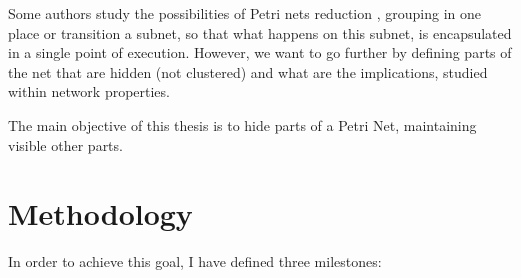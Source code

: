 Some authors study the possibilities of Petri nets reduction \citep{SN-Valette197935,SN-Suzuki198351,SN-Fahmy1990321,SN-DRUZHININVA19921922,SN-Fahmy1993127,R-Xia20111662}, grouping
in one place or transition a subnet, so that what happens
on this subnet, is encapsulated in a single point of execution. However,
we want to go further by defining parts of the net that are hidden (not clustered) and what are the implications, studied within
network properties.

The main objective of this thesis is to hide parts of a Petri Net, maintaining
visible other parts. \section{Methodology}


In order to achieve this goal, I have defined three milestones:


